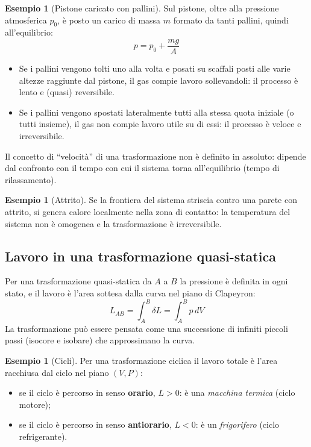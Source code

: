 \documentclass[11pt, a4paper, openright]{book}
\theoremstyle{plain}
\theoremstyle{definition}
\newtheorem{esempio}[teorema]{Esempio}
\theoremstyle{remark}
\begin{document}
\begin{esempio}[Pistone caricato con pallini]
    Sul pistone, oltre alla pressione atmosferica $p_0$, è posto un carico di massa $m$ formato da tanti pallini, quindi all'equilibrio:
    \begin{equation}
        p = p_0 + \frac{mg}{A}
    \end{equation}
    \begin{itemize}
        \item Se i pallini vengono tolti uno alla volta e posati su scaffali posti alle varie altezze raggiunte dal pistone, il gas compie lavoro sollevandoli: il processo è lento e (quasi) reversibile.
        \item Se i pallini vengono spostati lateralmente tutti alla stessa quota iniziale (o tutti insieme), il gas non compie lavoro utile su di essi: il processo è veloce e irreversibile.
    \end{itemize}
    Il concetto di ``velocità'' di una trasformazione non è definito in assoluto: dipende dal confronto con il tempo con cui il sistema torna all'equilibrio (tempo di rilassamento).
\end{esempio}

\begin{esempio}[Attrito]
    Se la frontiera del sistema striscia contro una parete con attrito, si genera calore localmente nella zona di contatto: la temperatura del sistema non è omogenea e la trasformazione è irreversibile.
\end{esempio}

\subsection{Lavoro in una trasformazione quasi-statica}
Per una trasformazione quasi-statica da $A$ a $B$ la pressione è definita in ogni stato, e il lavoro è l'area sottesa dalla curva nel piano di Clapeyron:
\begin{equation}
    L_{AB} = \int_A^B \delta L = \int_A^B p\, dV
\end{equation}
La trasformazione può essere pensata come una successione di infiniti piccoli passi (isocore e isobare) che approssimano la curva.

\begin{esempio}[Cicli]
    Per una trasformazione ciclica il lavoro totale è l'area racchiusa dal ciclo nel piano $(V, P)$:
    \begin{itemize}
        \item se il ciclo è percorso in senso \textbf{orario}, $L > 0$: è una \emph{macchina termica} (ciclo motore);
        \item se il ciclo è percorso in senso \textbf{antiorario}, $L < 0$: è un \emph{frigorifero} (ciclo refrigerante).
    \end{itemize}
\end{esempio}
\end{document}
